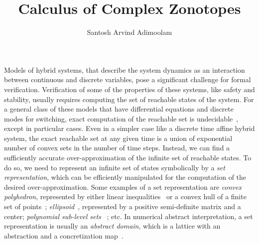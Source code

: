 \documentclass[11pt,a4paper,twoside,openright]{article}
\title{Calculus of Complex Zonotopes}
\author{Santosh Arvind Adimoolam}
\date{}
\begin{document}
\maketitle Models of hybrid systems, that describe the system dynamics
as an interaction between continuous and discrete variables, pose a
significant challenge for formal verification.  Verification of some
of the properties of these systems, like safety and stability, usually
requires computing the set of reachable states of the system.  For a
general class of these models that have differential equations and
discrete modes for switching, exact computation of the reachable set
is undecidable~\cite{todo}, except in particular cases.  Even in a
simpler case like a discrete time affine hybrid system, the exact
reachable set at any given time is a union of exponential number of
convex sets in the number of time steps.  Instead, we can find a
sufficiently accurate over-approximation of the infinite set of
reachable states.  To do so, we need to represent an infinite set of
states symbolically by a {\it set representation}, which can be
efficiently manipulated for the computation of the desired
over-approximation.  Some examples of a set representation are {\it
  convex polyhedron}, represented by either linear
inequalities~\cite{cousot1978automatic,Sankaranarayanan+Dang+Ivancic-08-Symbolic}
or a convex hull of a finite set of points~\cite{kvasnica2004multi};
{\it
  ellipsoid}~\cite{DBLP:journals/tecs/AllamigeonGSGP16,kurzhanskiy2006ellipsoidal},
represented by a positive semi-definite matrix and a center; {\it polynomial
  sub-level sets}~\cite{DBLP:conf/esop/AdjeGG10,prajna2004safety} ;
etc.  In numerical abstract interpretation, a set representation is
usually an {\it abstract domain}, which is a lattice with an
abstraction and a concretization map~\cite{jeannet2009apron}.
\end{document}
